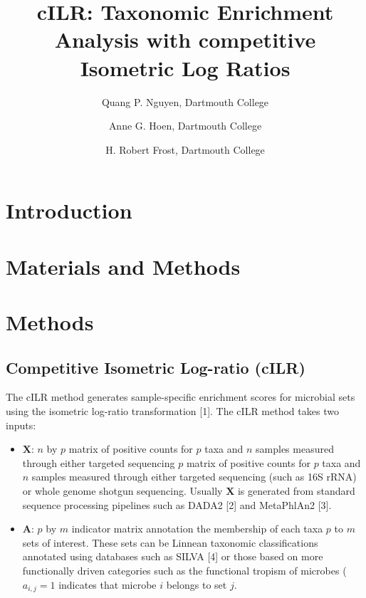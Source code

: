 \documentclass[
]{article}
\title{cILR: Taxonomic Enrichment Analysis with competitive Isometric
Log Ratios}
\author{Quang P. Nguyen, Dartmouth College \and Anne G. Hoen, Dartmouth
College \and H. Robert Frost, Dartmouth College}
\date{}
\providecommand{\tightlist}{%
  \setlength{\itemsep}{0pt}\setlength{\parskip}{0pt}}
\begin{document}
\maketitle

\hypertarget{introduction}{%
\section{Introduction}\label{introduction}}

\hypertarget{materials-and-methods}{%
\section{Materials and Methods}\label{materials-and-methods}}

\hypertarget{methods}{%
\section{Methods}\label{methods}}

\hypertarget{competitive-isometric-log-ratio-cilr}{%
\subsection{Competitive Isometric Log-ratio
(cILR)}\label{competitive-isometric-log-ratio-cilr}}

The cILR method generates sample-specific enrichment scores for
microbial sets using the isometric log-ratio transformation {[}1{]}. The
cILR method takes two inputs:

\begin{itemize}
\tightlist
\item
  \(\mathbf{X}\): \(n\) by \(p\) matrix of positive counts for \(p\)
  taxa and \(n\) samples measured through either targeted sequencing
  \(p\) matrix of positive counts for \(p\) taxa and \(n\) samples
  measured through either targeted sequencing (such as 16S rRNA) or
  whole genome shotgun sequencing. Usually \(\mathbf{X}\) is generated
  from standard sequence processing pipelines such as DADA2 {[}2{]} and
  MetaPhlAn2 {[}3{]}.
\item
  \(\mathbf{A}\): \(p\) by \(m\) indicator matrix annotation the
  membership of each taxa \(p\) to \(m\) sets of interest. These sets
  can be Linnean taxonomic classifications annotated using databases
  such as SILVA {[}4{]} or those based on more functionally driven
  categories such as the functional tropism of microbes (\(a_{i,j} = 1\)
  indicates that microbe \(i\) belongs to set \(j\).
\end{itemize}
\end{document}
